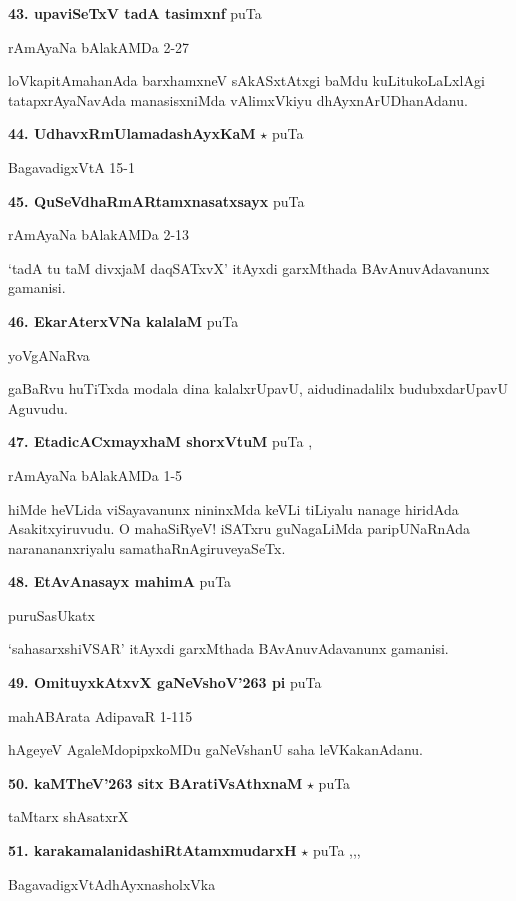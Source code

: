 \medskip
\noindent\textbf{43. upaviSeTxV tadA tasimxnf} \hfill puTa \pageref{203}

\hfill rAmAyaNa bAlakAMDa 2-27

loVkapitAmahanAda barxhamxneV sAkASxtAtxgi baMdu kuLitukoLaLxlAgi tatapxrAyaNavAda manasisxniMda vAlimxVkiyu dhAyxnArUDhanAdanu.

\medskip
\noindent\textbf{44. UdhavxRmUlamadashAyxKaM} $\star$ \hfill puTa \pageref{13a}

\hfill BagavadigxVtA 15-1

\medskip
\noindent\textbf{45. QuSeVdhaRmARtamxnasatxsayx} \hfill puTa \pageref{165d}

\hfill rAmAyaNa bAlakAMDa 2-13

`tadA tu taM divxjaM daqSATxvX' itAyxdi garxMthada BAvAnuvAdavanunx gamanisi.

\medskip
\noindent\textbf{46. EkarAterxVNa kalalaM} \hfill puTa \pageref{85}

\hfill yoVgANaRva

gaBaRvu huTiTxda modala dina kalalxrUpavU, aidudinadalilx budubxdarUpavU Aguvudu.

\medskip
\noindent\textbf{47. EtadicACxmayxhaM shorxVtuM} \hfill puTa \pageref{153a},\pageref{194d}

\hfill rAmAyaNa bAlakAMDa 1-5

hiMde heVLida viSayavanunx nininxMda keVLi tiLiyalu nanage hiridAda Asakitxyiruvudu. O mahaSiRyeV! iSATxru guNagaLiMda paripUNaRnAda naranananxriyalu samathaRnAgiruveyaSeTx.

\medskip
\noindent\textbf{48. EtAvAnasayx mahimA} \hfill puTa \pageref{249f}

\hfill puruSasUkatx

`sahasarxshiVSAR' itAyxdi garxMthada BAvAnuvAdavanunx gamanisi.

\medskip
\noindent\textbf{49. OmituyxkAtxvX gaNeVshoV\char'263 pi} \hfill puTa \pageref{119b}

\hfill mahABArata AdipavaR 1-115

hAgeyeV AgaleMdopipxkoMDu gaNeVshanU saha leVKakanAdanu.

\medskip
\noindent\textbf{50. kaMTheV\char'263 sitx BAratiVsAthxnaM} $\star$ \hfill puTa \pageref{31c}

\hfill taMtarx shAsatxrX

\medskip
\noindent\textbf{51. karakamalanidashiRtAtamxmudarxH} $\star$ \hfill puTa \pageref{48},\pageref{92},\pageref{217},\pageref{226}

\hfill BagavadigxVtAdhAyxnasholxVka

